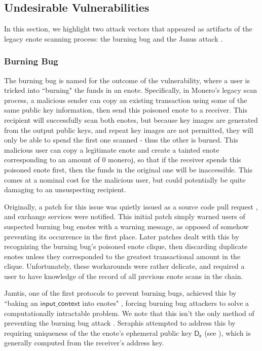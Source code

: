 \documentclass{article}
\theoremstyle{definition}
\newcommand{\6}{\mathbf}
\newcommand{\7}{\mathcal}
\renewcommand{\sf}[1]{{\mathsf{#1}}}
\begin{document}
\subsection{Undesirable Vulnerabilities}

In this section, we highlight two attack vectors that appeared as artifacts of the legacy enote scanning process: the burning bug \cite{BurningBug} and the Janus attack \cite{Janus}. 





\subsubsection{Burning Bug}\label{sec:burning}

The burning bug \cite{BurningBug} is named for the outcome of the vulnerability, where a user is tricked into ``burning" the funds in an enote. 
Specifically, in Monero's legacy scan process, a malicious sender can copy an existing transaction using some of the same public key information, then send this poisoned enote to a receiver. 
This recipient will successfully scan both enotes, but because key images are generated from the output public keys, and repeat key images are not permitted, they will only be able to spend the first one scanned - thus the other is burned.
This malicious user can copy a legitimate enote and create a tainted 
enote corresponding to an amount of 0 moneroj, so that if the receiver spends this poisoned enote first, then the funds in the original one will be inaccessible. 
This comes at a nominal 
cost for the malicious user, but could potentially be quite damaging to an unsuspecting recipient.
\medskip 


Originally, a patch for this issue was quietly issued as a source code pull request \cite{BurningBugPatch}, and exchange services were notified. 
This initial patch simply warned users of suspected burning bug enotes with a warning message, as opposed of somehow preventing its occurrence in the first place. 
Later patches dealt with this by recognizing the burning bug's poisoned enote clique, then discarding duplicate enotes unless they corresponded to the greatest transactional amount in the clique.
Unfortunately, these workarounds were rather delicate, and required a user to have knowledge of the record of all previous enote scans in the chain.

\medskip 

Jamtis, one of the first protocols to prevent burning bugs, achieved this by ``baking an $\sf{input\_context}$ into enotes" \cite{ImplemetingSeraphis}, forcing burning bug attackers to solve a computationally intractable problem.
We note that this isn't the only method of preventing the burning bug attack \cite{BurningBugKayaba}.
Seraphis attempted to address this by requiring uniqueness of the the enote's ephemeral public key $\sf{D_e}$ (see \cite[Section 8.2.2]{ImplemetingSeraphis}), which is generally computed from the receiver’s address key.
\end{document}
